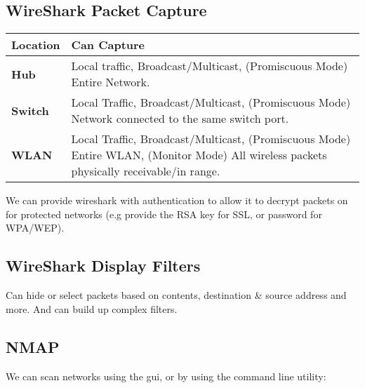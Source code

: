 \documentclass{report}
\begin{document}
\subsection*{WireShark Packet Capture}
\begin{center}
    \begin{tabular}{l p{}}
        \textbf{Location} & \textbf{Can Capture} \\
        \hline
        \textbf{Hub} & Local traffic, Broadcast/Multicast, (Promiscuous Mode) Entire Network. \\
        \textbf{Switch} & Local Traffic, Broadcast/Multicast, (Promiscuous Mode) Network connected to the same switch port. \\
        \textbf{WLAN} & Local Traffic, Broadcast/Multicast, (Promiscuous Mode) Entire WLAN, (Monitor Mode) All wireless packets physically receivable/in range. \\
    \end{tabular}
\end{center}
We can provide wireshark with authentication to allow it to decrypt packets on for protected networks (e.g provide the RSA key for SSL, or password for WPA/WEP).

\subsection*{WireShark Display Filters}
Can hide or select packets based on contents, destination \& source address and more. And can build up complex filters.

\subsection*{NMAP}
We can scan networks using the gui, or by using the command line utility:
\end{document}

